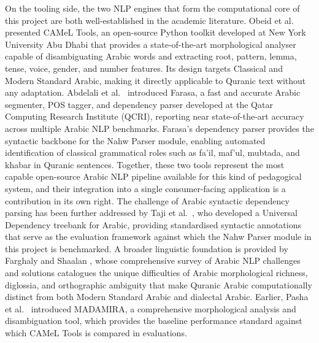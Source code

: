 \documentclass[A4paper,12pt]{article}
\begin{document}
On the tooling side, the two NLP engines that form the computational core of this project are
both well-established in the academic literature. Obeid et al.\ \cite{obeid2020} presented
CAMeL Tools, an open-source Python toolkit developed at New York University Abu Dhabi that
provides a state-of-the-art morphological analyser capable of disambiguating Arabic words and
extracting root, pattern, lemma, tense, voice, gender, and number features. Its design targets
Classical and Modern Standard Arabic, making it directly applicable to Quranic text without
any adaptation. Abdelali et al.\ \cite{abdelali2016} introduced Farasa, a fast and accurate
Arabic segmenter, POS tagger, and dependency parser developed at the Qatar Computing Research
Institute (QCRI), reporting near state-of-the-art accuracy across multiple Arabic NLP benchmarks.
Farasa's dependency parser provides the syntactic backbone for the Nahw Parser module, enabling
automated identification of classical grammatical roles such as fa'il, maf'ul, mubtada, and
khabar in Quranic sentences. Together, these two tools represent the most capable open-source
Arabic NLP pipeline available for this kind of pedagogical system, and their integration into a
single consumer-facing application is a contribution in its own right. The challenge of Arabic
syntactic dependency parsing has been further addressed by Taji et al.\ \cite{taji2017}, who
developed a Universal Dependency treebank for Arabic, providing standardised syntactic annotations
that serve as the evaluation framework against which the Nahw Parser module in this project is
benchmarked. A broader linguistic foundation is provided by Farghaly and Shaalan \cite{farghaly2009},
whose comprehensive survey of Arabic NLP challenges and solutions catalogues the unique difficulties
of Arabic morphological richness, diglossia, and orthographic ambiguity that make Quranic Arabic
computationally distinct from both Modern Standard Arabic and dialectal Arabic. Earlier,
Pasha et al.\ \cite{pasha2014} introduced MADAMIRA, a comprehensive morphological analysis and
disambiguation tool, which provides the baseline performance standard against which CAMeL Tools
is compared in evaluations.
\end{document}
